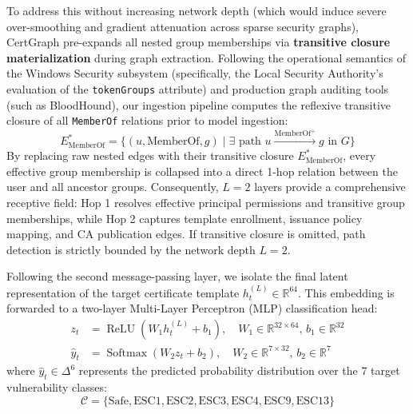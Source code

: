 To address this without increasing network depth (which would induce severe over-smoothing and gradient attenuation across sparse security graphs), CertGraph pre-expands all nested group memberships via \textbf{transitive closure materialization} during graph extraction. Following the operational semantics of the Windows Security subsystem (specifically, the Local Security Authority's evaluation of the \texttt{tokenGroups} attribute) and production graph auditing tools (such as BloodHound), our ingestion pipeline computes the reflexive transitive closure of all \texttt{MemberOf} relations prior to model ingestion:
\begin{equation}
E_{\text{MemberOf}}^* = \{(u, \text{MemberOf}, g) \mid \exists \text{ path } u \xrightarrow{\text{MemberOf}^+} g \text{ in } G\}
\end{equation}
By replacing raw nested edges with their transitive closure $E_{\text{MemberOf}}^*$, every effective group membership is collapsed into a direct 1-hop relation between the user and all ancestor groups. Consequently, $L = 2$ layers provide a comprehensive receptive field: Hop 1 resolves effective principal permissions and transitive group memberships, while Hop 2 captures template enrollment, issuance policy mapping, and CA publication edges. If transitive closure is omitted, path detection is strictly bounded by the network depth $L = 2$.

Following the second message-passing layer, we isolate the final latent representation of the target certificate template $h_t^{(L)} \in \mathbb{R}^{64}$. This embedding is forwarded to a two-layer Multi-Layer Perceptron (MLP) classification head:
\begin{align}
z_t &= \operatorname{ReLU} \left( W_1 h_t^{(L)} + b_1 \right), \quad W_1 \in \mathbb{R}^{32 \times 64}, \, b_1 \in \mathbb{R}^{32} \\
\hat{y}_t &= \operatorname{Softmax} \left( W_2 z_t + b_2 \right), \quad W_2 \in \mathbb{R}^{7 \times 32}, \, b_2 \in \mathbb{R}^{7}
\end{align}
where $\hat{y}_t \in \Delta^6$ represents the predicted probability distribution over the 7 target vulnerability classes:
\begin{equation}
\mathcal{C} = \{\text{Safe}, \text{ESC1}, \text{ESC2}, \text{ESC3}, \text{ESC4}, \text{ESC9}, \text{ESC13}\}
\end{equation}

